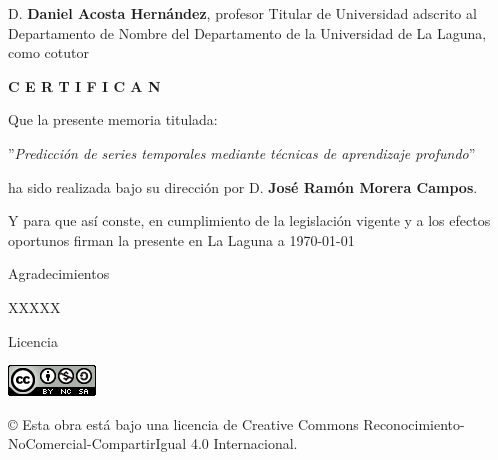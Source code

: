 \documentclass[spanish,a4paper,12pt,oneside]{extreport}
\begin{document}
\bigskip
D. {\bf Daniel Acosta Hernández}, profesor Titular de Universidad adscrito al Departamento de Nombre del Departamento de la Universidad de La Laguna, como cotutor\pagestyle{empty}

\bigskip
\bigskip
{\bf C E R T I F I C A N}

\bigskip
\bigskip
Que la presente memoria titulada:

\bigskip
''{\it Predicción de series temporales mediante técnicas de aprendizaje profundo}''

\bigskip
\bigskip
\bigskip

\noindent ha sido realizada bajo su dirección por D. {\bf José Ramón Morera Campos}.

\bigskip
\bigskip

Y para que así conste, en cumplimiento de la legislación vigente y a los efectos
oportunos firman la presente en La Laguna a \today

\newpage
\thispagestyle{empty}

{ \flushright

\begin{LARGE}
Agradecimientos
\end{LARGE}

\hspace{3mm}

\begin{large}
XXXXX
\end{large}

}
\newpage
\thispagestyle{empty}

\bigskip
\begin{LARGE}
Licencia
\end{LARGE}

\bigskip
\bigskip
\bigskip
\bigskip

\begin{center}
\includegraphics[scale=1.8]{images/by-nc-sa_88x31}\\[5mm]
\end{center}

\begin{large}
© Esta obra está bajo una licencia de Creative Commons Reconocimiento-NoComercial-CompartirIgual 4.0 Internacional.
\end{large}

\newpage 
\thispagestyle{empty}
\end{document}
